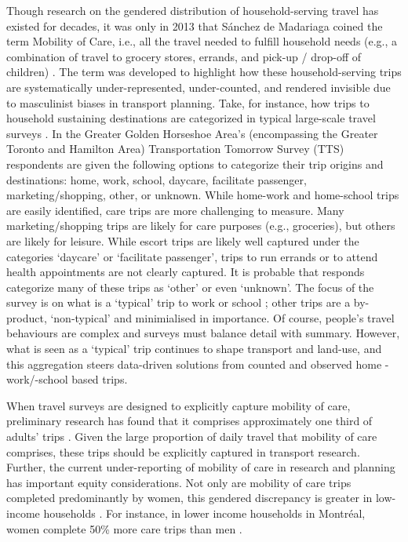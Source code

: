 \documentclass[
  authoryear,
  preprint,
  3p]{elsarticle}
\begin{document}
Though research on the gendered distribution of household-serving travel
has existed for decades, it was only in 2013 that Sánchez de Madariaga
coined the term Mobility of Care, i.e., all the travel needed to fulfill
household needs (e.g., a combination of travel to grocery stores,
errands, and pick-up / drop-off of children)
\citep{sanchezdemadariagaMobilityCareIntroducing2013}. The term was
developed to highlight how these household-serving trips are
systematically under-represented, under-counted, and rendered invisible
due to masculinist biases in transport planning. Take, for instance, how
trips to household sustaining destinations are categorized in typical
large-scale travel surveys
\citep{sanchezdemadariagaMobilityCareIntroducing2013}. In the Greater
Golden Horseshoe Area's (encompassing the Greater Toronto and Hamilton
Area) Transportation Tomorrow Survey (TTS)
\citep{transportationtomorrowsurvey2018} respondents are given the
following options to categorize their trip origins and destinations:
home, work, school, daycare, facilitate passenger, marketing/shopping,
other, or unknown. While home-work and home-school trips are easily
identified, care trips are more challenging to measure. Many
marketing/shopping trips are likely for care purposes (e.g., groceries),
but others are likely for leisure. While escort trips are likely well
captured under the categories `daycare' or `facilitate passenger', trips
to run errands or to attend health appointments are not clearly
captured. It is probable that responds categorize many of these trips as
`other' or even `unknown'. The focus of the survey is on what is a
`typical' trip to work or school
\citep{transportationtomorrowsurvey2018}; other trips are a by-product,
`non-typical' and minimialised in importance. Of course, people's travel
behaviours are complex and surveys must balance detail with summary.
However, what is seen as a `typical' trip continues to shape transport
and land-use, and this aggregation steers data-driven solutions from
counted and observed home -work/-school based trips.

When travel surveys are designed to explicitly capture mobility of care,
preliminary research has found that it comprises approximately one third
of adults' trips
\citep{gomezvaroAccountingCareEveryday2023, sanchezdemadariagaMobilityCareIntroducing2013, sanchezdemadariagaMeasuringMobilitiesCare2019, ravensbergenExploratoryAnalysisMobility2022}.
Given the large proportion of daily travel that mobility of care
comprises, these trips should be explicitly captured in transport
research. Further, the current under-reporting of mobility of care in
research and planning has important equity considerations. Not only are
mobility of care trips completed predominantly by women, this gendered
discrepancy is greater in low-income households
\citep{murillomunarCaregiversMoveGender2023, sanchezdemadariagaMobilityCareIntroducing2013, ravensbergenExploratoryAnalysisMobility2022}.
For instance, in lower income households in Montréal, women complete
50\% more care trips than men
\citep{ravensbergenExploratoryAnalysisMobility2022}.
\end{document}
